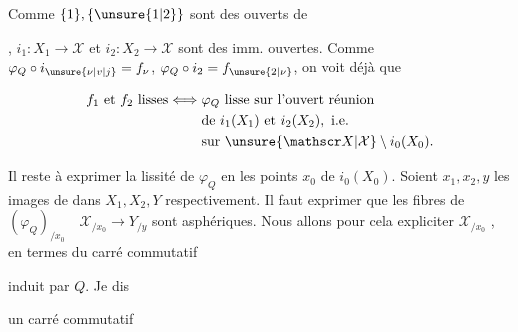 Comme $\{1\},\{\unsure{1|2}\}$ sont des  ouverts de


, $i_1:X_1\to\mathscr X$ et $i_2:X_2\to\mathscr X$ sont des imm. ouvertes. Comme $\varphi_Q\circ i_{\unsure{\nu|v|j}}=f_\nu$,
$\varphi_Q\circ i_2=f_{\unsure{2|\nu}}$, on voit déjà que

\[
\begin{aligned}
f_1\text{ et }f_2\text{ lisses}\Longleftrightarrow {}&\varphi_Q\text{ lisse sur l'ouvert réunion}\\
&\text{de }i_1(X_1)\text{ et }i_2(X_2),\ \text{i.e.}\\
&\text{sur }\unsure{\mathscr X|\mathcal X}\setminus i_0(X_0).
\end{aligned}
\]

Il reste à exprimer la lissité de $\varphi_Q$ en les points $x_0$ de $i_0(X_0)$. Soient $x_1,x_2,y$ les images de  dans $X_1,X_2,Y$ respectivement. Il faut exprimer que les fibres de  $(\varphi_Q)_{/x_0}\quad\mathscr X_{/x_0}\longrightarrow Y_{/y}$ sont asphériques.  Nous allons pour cela expliciter $\mathscr X_{/x_0}$ , en termes du carré commutatif


induit par $Q$. Je dis

  un carré commutatif 


